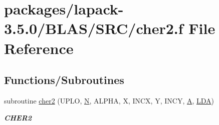 \hypertarget{lapack-3_85_80_2BLAS_2SRC_2cher2_8f}{}\section{packages/lapack-\/3.5.0/\+B\+L\+A\+S/\+S\+R\+C/cher2.f File Reference}
\label{lapack-3_85_80_2BLAS_2SRC_2cher2_8f}
\subsection*{Functions/\+Subroutines}
\begin{DoxyCompactItemize}
\item 
subroutine \hyperlink{group__complex__blas__level2_gaa59d93fbbd8d0b1be4a51634cb437cc1}{cher2} (U\+P\+L\+O, \hyperlink{polmisc_8c_a0240ac851181b84ac374872dc5434ee4}{N}, A\+L\+P\+H\+A, X, I\+N\+C\+X, Y, I\+N\+C\+Y, \hyperlink{classA}{A}, \hyperlink{example__user_8c_ae946da542ce0db94dced19b2ecefd1aa}{L\+D\+A})
\begin{DoxyCompactList}\small\item\em {\bfseries C\+H\+E\+R2} \end{DoxyCompactList}\end{DoxyCompactItemize}
